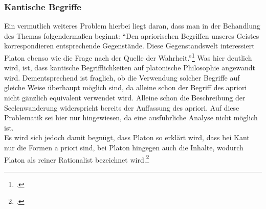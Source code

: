 \subsubsection{Kantische Begriffe}
Ein vermutlich weiteres Problem hierbei liegt daran, dass man in der Behandlung des Themas folgendermaßen beginnt: \enquote{Den apriorischen Begriffen unseres Geistes korrespondieren entsprechende Gegenstände. Diese Gegenstandswelt interessiert Platon ebenso wie die Frage nach der Quelle der Wahrheit.}\footcite[][S. 97]{Hirschberger}
Was hier deutlich wird, ist, dass kantische Begrifflichkeiten auf platonische Philosophie angewandt wird. Dementsprechend ist fraglich, ob die Verwendung solcher Begriffe auf gleiche Weise überhaupt möglich sind, da alleine schon der Begriff des apriori nicht gänzlich equivalent verwendet wird. Alleine schon die Beschreibung der Seelenwanderung widerspricht bereits der Auffassung des apriori. Auf diese Problematik sei hier nur hingewiesen, da eine ausführliche Analyse nicht möglich ist.\\ Es wird sich jedoch damit begnügt, dass Platon so erklärt wird, dass bei Kant nur die Formen a priori sind, bei Platon hingegen auch die Inhalte, wodurch Platon als reiner Rationalist bezeichnet wird.\footcite[vgl.][S.96]{Hirschberger} 

